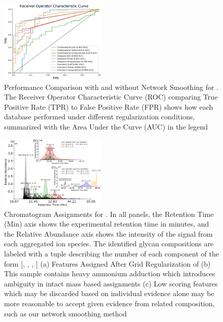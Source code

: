     \begin{figure}[!htb]
        \centering
        \includegraphics[width=0.45\textwidth,valign=t]{figure/serum_roc.eps}
        \caption{Performance Comparison with and without Network Smoothing for \rpserum
                 \label{fig:rpserum_perf}. The Receiver Operator Characteristic Curve (ROC)
                 comparing True Positive Rate (TPR) to False Positive Rate (FPR) shows how
                 each database performed under different regularization conditions, summarized
                 with the Area Under the Curve (AUC) in the legend}
    \end{figure}
    \hfill
    \begin{figure}[!htb]
        \includegraphics[width=0.45\textwidth, valign=t]{figure/rp_serum_chromatogram_details.eps}
        \caption{Chromatogram Assignments for \rpserum. In all panels, the Retention Time (Min) axis shows
            the experimental retention time in minutes, and the Relative Abundance axis shows the intensity
            of the signal from each aggregated ion species. The identified glycan compositions
            are labeled with a tuple describing the number of each component of the form
            [, , , ]
            (a) Features Assigned After Grid Regularization of \rpserum (b) This sample
            contains heavy ammonium adduction which introduces ambiguity in intact mass based assignments
            (c) Low scoring features which may be discarded based on individual evidence alone may be more
            reasonable to accept given evidence from related composition, such as our network smoothing method
            \label{fig:rpserum_assignments}
        }
    \end{figure}
